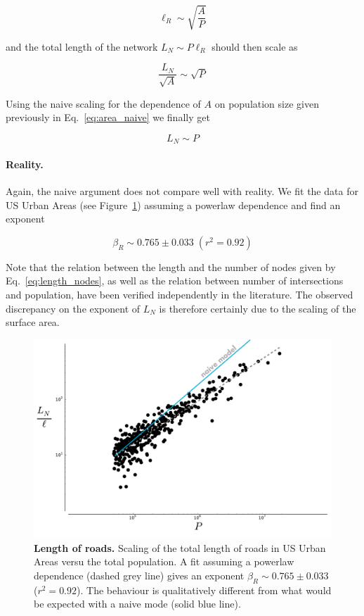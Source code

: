 \begin{equation} 
    \ell_R \sim \sqrt{\frac{A}{P}} 
    \label{eq:length_nodes}
\end{equation}

and the total length of the network $L_N \sim P\ell_R$ should then scale as

\begin{equation} 
    \frac{L_N}{\sqrt{A}} \sim \sqrt{P} 
\end{equation}

Using the naive scaling for the dependence of $A$ on population size given
previously in Eq.~\ref{eq:area_naive} we finally get 

\begin{equation} 
    L_N \sim P
\end{equation}

\paragraph{Reality.} Again, the naive argument does not compare well with
reality. We fit the data for US Urban Areas (see
Figure~\ref{fig:scaling_lanemiles}) assuming a powerlaw dependence and find an
exponent

\begin{equation}
    \boxed{\beta_R \sim 0.765 \pm 0.033\;(r^2 = 0.92)}
\end{equation}

Note that the relation between the length and the number of nodes given by
Eq.~\ref{eq:length_nodes}, as well as the relation between number of
intersections and population, have been verified independently in the
literature. The observed discrepancy on the exponent of $L_N$ is therefore
certainly due to the scaling of the surface area.

\begin{figure}
    \centering
    \includegraphics[width=\textwidth]{gfx/chapter-scaling/scaling_lanemiles.pdf}
    \caption{{\bf Length of roads.} Scaling of the total length of roads in US Urban Areas versu the
    total population. A fit assuming a powerlaw dependence (dashed grey line)
gives an exponent $\beta_R \sim 0.765 \pm 0.033$ ($r^2=0.92$). The behaviour is
qualitatively different from what would be expected with a naive mode (solid
blue line).\label{fig:scaling_lanemiles}}
\end{figure}



